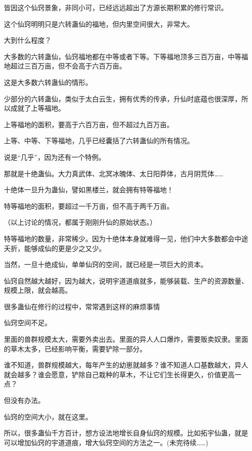\begin{this_body}
皆因这个仙窍景象，非同小可，已经远远超出了方源长期积累的修行常识。

这个仙窍明明只是六转蛊仙的福地，但内里空间很大，非常大。

大到什么程度？

大多数的六转蛊仙，仙窍福地都在中等或者下等。下等福地顶多三百万亩，中等福地超过三百万亩，但不会高于六百万亩。

这是大多数六转蛊仙的情形。

少部分的六转蛊仙，类似于太白云生，拥有优秀的传承，升仙时底蕴也很深厚，所以成就了上等福地。

上等福地的面积，要高于六百万亩，但不超过九百万亩。

上等、中等、下等福地，几乎已经囊括了六转蛊仙的所有情况。

说是“几乎”，因为还有一个特例。

那就是十绝蛊仙。大力真武体、北冥冰魄体、太日阳莽体，古月阴荒体……

十绝体一旦升为蛊仙，譬如黑楼兰，就会拥有特等福地！

特等福地的面积，要超过一千万亩，但不高于两千万亩。

（以上讨论的情况，都属于刚刚升仙的原始状态。）

特等福地的数量，非常稀少。因为十绝体本身就难得一见，他们中大多数都会中途夭折，能够成仙的更是少之又少。

当然，一旦十绝成仙，单单仙窍的空间，就已经是一项巨大的资本。

仙窍自然越大越好，因为越大，说明宇道道痕就多，能够装载、生产的资源数量、规模上限，就会越高。

很多蛊仙在修行的过程中，常常遇到这样的麻烦事情

仙窍空间不足。

里面的兽群规模太大，需要外卖出去。里面的异人人口爆炸，需要贩卖奴隶。里面的草木太多，已经影响平衡，需要铲除一部分。

谁不知道，兽群规模越大，每年产生的幼崽就越多？谁不知道人口基数越大，异人就会越多？谁会愿意，铲除自己栽种的草木，不让它们生长得更久，价值更高一点？

但没有办法。

仙窍的空间大小，就在这里。

所以，很多蛊仙千方百计，想方设法地增长自身仙窍的规模。比如拓宇仙蛊，就是可以增加仙窍的宇道道痕，增大仙窍空间的方法之一。(未完待续……)

\end{this_body}

